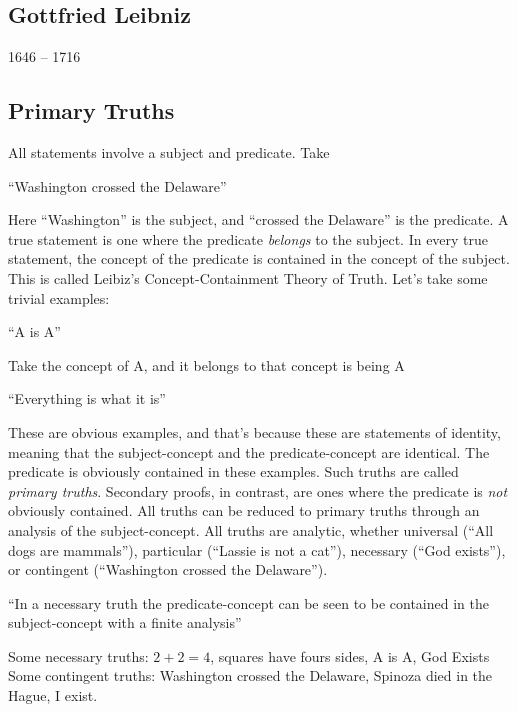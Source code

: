 \documentclass{article}
\begin{document}
    \begin{spacing}{1.2}
    \newpage
        \section*{Gottfried Leibniz}
        \begin{flushright}
            1646 -- 1716
        \end{flushright}
        \subsection*{Primary Truths}
        All statements involve a subject and predicate.
        Take

        ``Washington crossed the Delaware''

        \noindent Here ``Washington'' is the subject, and ``crossed the Delaware'' is the predicate.
        A true statement is one where the predicate \emph{belongs} to the subject. In every true statement, the concept of the predicate is contained in the concept of the subject. This is called Leibiz's Concept-Containment Theory of Truth.
        Let's take some trivial examples:

            ``A is A''

        \noindent Take the concept of A, and it belongs to that concept is being A

            ``Everything is what it is''

        \noindent These are obvious examples, and that's because these are statements of identity, meaning that the subject-concept and the predicate-concept are identical. The predicate is obviously contained in these examples. Such truths are called \emph{primary truths}. Secondary proofs, in contrast, are ones where the predicate is \emph{not} obviously contained. All truths can be reduced to primary truths through an analysis of the subject-concept. All truths are analytic, whether universal (``All dogs are mammals''), particular (``Lassie is not a cat''), necessary (``God exists''), or contingent (``Washington crossed the Delaware'').

        ``In a necessary truth the predicate-concept can be seen to be contained in the subject-concept with a finite analysis''

        Some necessary truths: \(2+2=4\), squares have fours sides, A is A, God Exists
        Some contingent truths: Washington crossed the Delaware, Spinoza died in the Hague, I exist.


\end{spacing}
\end{document}
